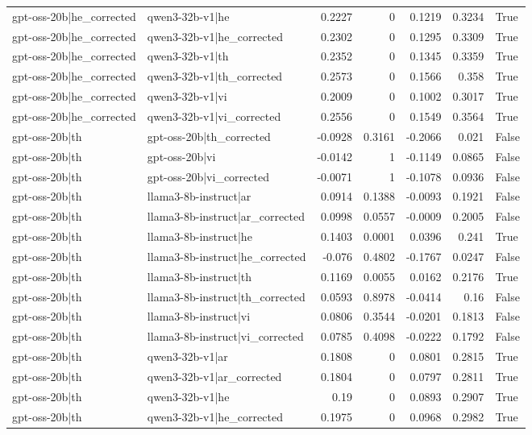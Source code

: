 \begin{table}
\begin{tabular}{l l r r r r l}
gpt-oss-20b|he_corrected & qwen3-32b-v1|he & 0.2227 & 0 & 0.1219 & 0.3234 & True \\
gpt-oss-20b|he_corrected & qwen3-32b-v1|he_corrected & 0.2302 & 0 & 0.1295 & 0.3309 & True \\
gpt-oss-20b|he_corrected & qwen3-32b-v1|th & 0.2352 & 0 & 0.1345 & 0.3359 & True \\
gpt-oss-20b|he_corrected & qwen3-32b-v1|th_corrected & 0.2573 & 0 & 0.1566 & 0.358 & True \\
gpt-oss-20b|he_corrected & qwen3-32b-v1|vi & 0.2009 & 0 & 0.1002 & 0.3017 & True \\
gpt-oss-20b|he_corrected & qwen3-32b-v1|vi_corrected & 0.2556 & 0 & 0.1549 & 0.3564 & True \\
gpt-oss-20b|th & gpt-oss-20b|th_corrected & -0.0928 & 0.3161 & -0.2066 & 0.021 & False \\
gpt-oss-20b|th & gpt-oss-20b|vi & -0.0142 & 1 & -0.1149 & 0.0865 & False \\
gpt-oss-20b|th & gpt-oss-20b|vi_corrected & -0.0071 & 1 & -0.1078 & 0.0936 & False \\
gpt-oss-20b|th & llama3-8b-instruct|ar & 0.0914 & 0.1388 & -0.0093 & 0.1921 & False \\
gpt-oss-20b|th & llama3-8b-instruct|ar_corrected & 0.0998 & 0.0557 & -0.0009 & 0.2005 & False \\
gpt-oss-20b|th & llama3-8b-instruct|he & 0.1403 & 0.0001 & 0.0396 & 0.241 & True \\
gpt-oss-20b|th & llama3-8b-instruct|he_corrected & -0.076 & 0.4802 & -0.1767 & 0.0247 & False \\
gpt-oss-20b|th & llama3-8b-instruct|th & 0.1169 & 0.0055 & 0.0162 & 0.2176 & True \\
gpt-oss-20b|th & llama3-8b-instruct|th_corrected & 0.0593 & 0.8978 & -0.0414 & 0.16 & False \\
gpt-oss-20b|th & llama3-8b-instruct|vi & 0.0806 & 0.3544 & -0.0201 & 0.1813 & False \\
gpt-oss-20b|th & llama3-8b-instruct|vi_corrected & 0.0785 & 0.4098 & -0.0222 & 0.1792 & False \\
gpt-oss-20b|th & qwen3-32b-v1|ar & 0.1808 & 0 & 0.0801 & 0.2815 & True \\
gpt-oss-20b|th & qwen3-32b-v1|ar_corrected & 0.1804 & 0 & 0.0797 & 0.2811 & True \\
gpt-oss-20b|th & qwen3-32b-v1|he & 0.19 & 0 & 0.0893 & 0.2907 & True \\
gpt-oss-20b|th & qwen3-32b-v1|he_corrected & 0.1975 & 0 & 0.0968 & 0.2982 & True \\

\end{tabular}
\end{table}
